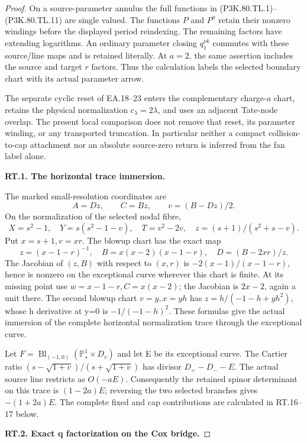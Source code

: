 \begin{proof}
On a source-parameter annulus the full functions in (P3K.80.TL.1)--(P3K.80.TL.11)
are single valued. The functions \(P\) and \(P^a\) retain their
nonzero windings before the displayed period reindexing. The
remaining factors have extending logarithms. An ordinary parameter
closing \(q_1^{\nu k}\) commutes with these source/line maps and
is retained literally. At \(a=2\), the same assertion includes
the source and target \(r\) factors. Thus the calculation labels
the selected boundary chart with its actual parameter arrow.

The separate cyclic reset of EA.18--23 enters the complementary
charge-\(a\) chart, retains the physical normalization
\(c_\lambda=2\lambda\), and uses an adjacent Tate-node overlap.
The present local comparison does not remove that reset, its
parameter winding, or any transported truncation. In particular
neither a compact collision-to-cap attachment nor an absolute
source-zero return is inferred from the fan label alone.

\par\medskip\noindent\textbf{RT.1. The horizontal trace immersion.}\par\nopagebreak[4]

The marked small-resolution coordinates are
\[
 A=Dz,\qquad C=Bz,\qquad v=(B-Dz)/2.
\]
On the normalization of the selected nodal fibre,
\[
 X=s^2-1,\quad Y=s(s^2-1-v),\quad T=v^2-2v,\quad
 z=(s+1)/(s^2+s-v).
\]
Put \(x=s+1,v=xr\). The blowup chart has the exact map
\[
 z=(x-1-r)^{-1},\quad B=x(x-2)(x-1-r),\quad
 D=(B-2xr)/z.
\]
The Jacobian of \((z,B)\) with respect to \((x,r)\) is
\(-2(x-1)/(x-1-r)\), hence is nonzero on the exceptional curve wherever
this chart is finite. At its missing point use
\(w=x-1-r,C=x(x-2)\); the Jacobian is \(2x-2\), again a unit there.
The second blowup chart \(v=y,x=yh\) has
\(z=h/(-1-h+yh^2)\), whose h derivative at y=0 is
\(-1/(-1-h)^2\). These formulas give the actual immersion of the complete
horizontal normalization trace through the exceptional curve.

Let \(F=\operatorname{Bl}_{(-1,0)}(\mathbb P^1_s\times D_v)\) and let E
be its exceptional curve. The Cartier ratio
\((s-\sqrt{1+v})/(s+\sqrt{1+v})\) has divisor
\(D_+-D_--E\). The actual source line restricts as \(O(-aE)\).
Consequently the retained spinor determinant on this trace is
\((1-2a)E\); reversing the two selected branches gives
\(-(1+2a)E\).
The complete fixed and cap contributions are calculated in RT.16--17 below.


\par\medskip\noindent\textbf{RT.2. Exact q factorization on the Cox bridge.}\par\nopagebreak[4]


\end{proof}
